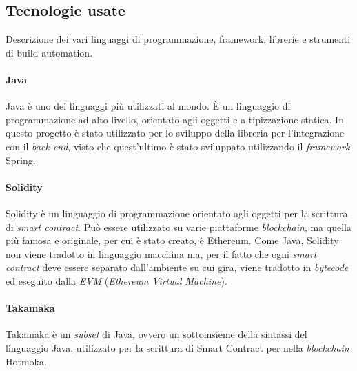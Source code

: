 \subsection{Tecnologie usate}
Descrizione dei vari linguaggi di programmazione, framework, librerie e strumenti di build automation.

\paragraph{Java} 
Java è uno dei linguaggi più utilizzati al mondo. È un linguaggio di programmazione ad alto livello, orientato agli oggetti e a tipizzazione statica. In questo progetto è stato utilizzato per lo sviluppo della libreria per l'integrazione con il \textit{back-end}, visto che quest'ultimo è stato sviluppato utilizzando il \textit{framework} Spring. 

\paragraph{Solidity}
Solidity è un linguaggio di programmazione orientato agli oggetti per la scrittura di \textit{smart contract}. Può essere utilizzato su varie piattaforme \textit{blockchain}, ma quella più famosa e originale, per cui è stato creato, è Ethereum. Come Java, Solidity non viene tradotto in linguaggio macchina ma, per il fatto che ogni \textit{smart contract} deve essere separato dall'ambiente su cui gira, viene tradotto in \textit{bytecode} ed eseguito dalla \textit{EVM} (\textit{Ethereum Virtual Machine}).

\paragraph{Takamaka}
Takamaka è un \textit{subset} di Java, ovvero un sottoinsieme della sintassi del linguaggio Java, utilizzato per la scrittura di Smart Contract per nella \textit{blockchain} Hotmoka.


